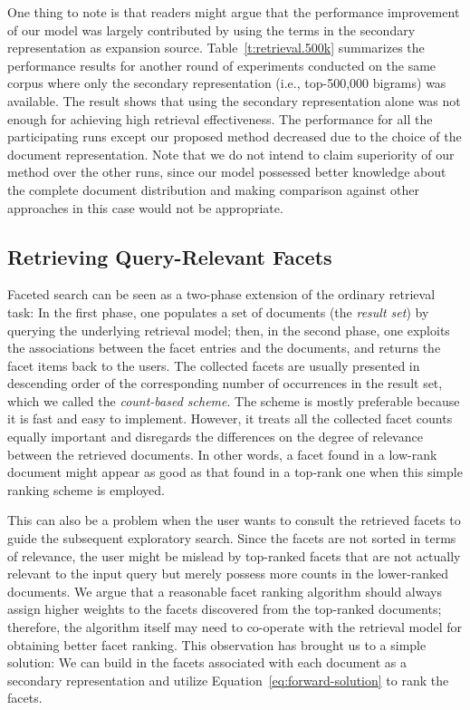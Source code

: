 One thing to note is that readers might argue that the performance improvement
of our model was largely contributed by using the terms in the secondary
representation as expansion source.  Table~\ref{t:retrieval.500k} summarizes
the performance results for another round of experiments conducted on the same
corpus where only the secondary representation (i.e., top-500,000 bigrams) was
available.  The result shows that using the secondary representation alone was
not enough for achieving high retrieval effectiveness.  The performance for all
the participating runs except our proposed method decreased due to the choice
of the document representation.  Note that we do not intend to claim
superiority of our method over the other runs, since our model possessed better
knowledge about the complete document distribution and making comparison
against other approaches in this case would not be appropriate.

\subsection{Retrieving Query-Relevant Facets}\label{s:facet-ranking}

Faceted search \cite{hearst2002finding,yee2003faceted,roy2008minimum} can be
seen as a two-phase extension of the ordinary retrieval task: In the first
phase, one populates a set of documents (the \emph{result set}) by querying the
underlying retrieval model; then, in the second phase, one exploits the
associations between the facet entries and the documents, and returns the facet
items back to the users.  The collected facets are usually presented in
descending order of the corresponding number of occurrences in the result set,
which we called the \emph{count-based scheme}.  The scheme is mostly preferable
because it is fast and easy to implement.  However, it treats all the collected
facet counts equally important and disregards the differences on the degree of
relevance between the retrieved documents.  In other words, a facet found in a
low-rank document might appear as good as that found in a top-rank one when
this simple ranking scheme is employed.

This can also be a problem when the user wants to consult the retrieved facets
to guide the subsequent exploratory search.  Since the facets are not sorted in
terms of relevance, the user might be mislead by top-ranked facets that are not
actually relevant to the input query but merely possess more counts in the
lower-ranked documents.  We argue that a reasonable facet ranking algorithm
should always assign higher weights to the facets discovered from the
top-ranked documents; therefore, the algorithm itself may need to co-operate
with the retrieval model for obtaining better facet ranking.  This observation
has brought us to a simple solution: We can build in the facets associated with
each document as a secondary representation and utilize
Equation~\ref{eq:forward-solution} to rank the facets.  


